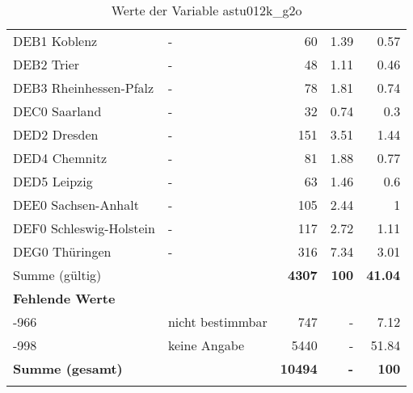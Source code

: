 \begin{longtable}{Xlrrr}
        \multicolumn{1}{X}{DEB1 Koblenz} & - & \num{60} & \num[round-mode=places,round-precision=2]{1.39} & \num[round-mode=places,round-precision=2]{0.57} \\
        \multicolumn{1}{X}{DEB2 Trier} & - & \num{48} & \num[round-mode=places,round-precision=2]{1.11} & \num[round-mode=places,round-precision=2]{0.46} \\
        \multicolumn{1}{X}{DEB3 Rheinhessen-Pfalz} & - & \num{78} & \num[round-mode=places,round-precision=2]{1.81} & \num[round-mode=places,round-precision=2]{0.74} \\
        \multicolumn{1}{X}{DEC0 Saarland} & - & \num{32} & \num[round-mode=places,round-precision=2]{0.74} & \num[round-mode=places,round-precision=2]{0.3} \\
        \multicolumn{1}{X}{DED2 Dresden} & - & \num{151} & \num[round-mode=places,round-precision=2]{3.51} & \num[round-mode=places,round-precision=2]{1.44} \\
        \multicolumn{1}{X}{DED4 Chemnitz} & - & \num{81} & \num[round-mode=places,round-precision=2]{1.88} & \num[round-mode=places,round-precision=2]{0.77} \\
        \multicolumn{1}{X}{DED5 Leipzig} & - & \num{63} & \num[round-mode=places,round-precision=2]{1.46} & \num[round-mode=places,round-precision=2]{0.6} \\
        \multicolumn{1}{X}{DEE0 Sachsen-Anhalt} & - & \num{105} & \num[round-mode=places,round-precision=2]{2.44} & \num[round-mode=places,round-precision=2]{1} \\
        \multicolumn{1}{X}{DEF0 Schleswig-Holstein} & - & \num{117} & \num[round-mode=places,round-precision=2]{2.72} & \num[round-mode=places,round-precision=2]{1.11} \\
        \multicolumn{1}{X}{DEG0 Thüringen} & - & \num{316} & \num[round-mode=places,round-precision=2]{7.34} & \num[round-mode=places,round-precision=2]{3.01} \\
     \midrule
      \multicolumn{2}{l}{Summe (gültig)} & \textbf{\num{4307}} &
      \textbf{\num{100}} &
         \textbf{\num[round-mode=places,round-precision=2]{41.04}} \\
     \multicolumn{5}{l}{\textbf{Fehlende Werte}}\\
       -966 & nicht bestimmbar & \num{747} & - & \num[round-mode=places,round-precision=2]{7.12} \\

       -998 & keine Angabe & \num{5440} & - & \num[round-mode=places,round-precision=2]{51.84} \\

     \midrule
     \multicolumn{2}{l}{\textbf{Summe (gesamt)}} & \textbf{\num{10494}} & \textbf{-} & \textbf{\num{100}} \\
     \bottomrule
     \caption{Werte der Variable astu012k\_g2o}
     \end{longtable}
     
